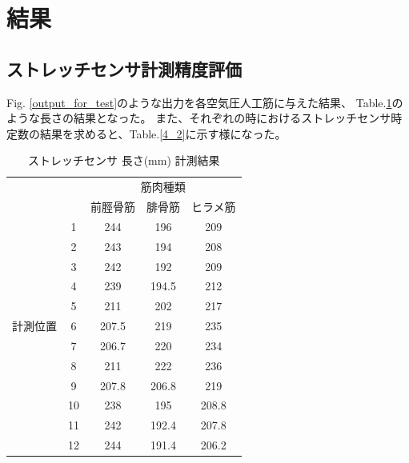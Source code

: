 \section{結果}
\subsection{ストレッチセンサ計測精度評価}
Fig. \ref{output_for_test}のような出力を各空気圧人工筋に与えた結果、
Table.\ref{strain}のような長さの結果となった。
また、それぞれの時におけるストレッチセンサ時定数の結果を求めると、Table.\ref{4_2}に示す様になった。
\begin{table}[h]
    \caption{ストレッチセンサ 長さ(mm) 計測結果}
    \label{strain}
    \begin{center}
        \begin{tabular}{|c|c|ccc|}\hline
            \multicolumn{2}{|c|}{} & \multicolumn{3}{c|}{筋肉種類}\\
            \cline{3-5}
            \multicolumn{2}{|c|}{} & 前脛骨筋 & 腓骨筋 & ヒラメ筋 \\ \hline
            & 1 & 244 & 196 & 209 \\ \cline{2-5}
            & 2 & 243 & 194 & 208 \\ \cline{2-5}
            & 3 & 242 & 192 & 209 \\ \cline{2-5}
            & 4 & 239 & 194.5 & 212 \\ \cline{2-5}
            & 5 & 211 & 202 & 217 \\ \cline{2-5}
            計測位置 & 6 & 207.5 & 219 & 235 \\ \cline{2-5}
            & 7 & 206.7 & 220 & 234 \\ \cline{2-5}
            & 8 & 211 & 222 & 236 \\ \cline{2-5}
            & 9 & 207.8 & 206.8 & 219 \\ \cline{2-5}
            & 10 & 238 & 195 & 208.8 \\ \cline{2-5}
            & 11 & 242 & 192.4 & 207.8 \\ \cline{2-5}
            & 12 & 244 & 191.4 & 206.2 \\ \hline
        \end{tabular}
    \end{center}
\end{table}

\newpage

